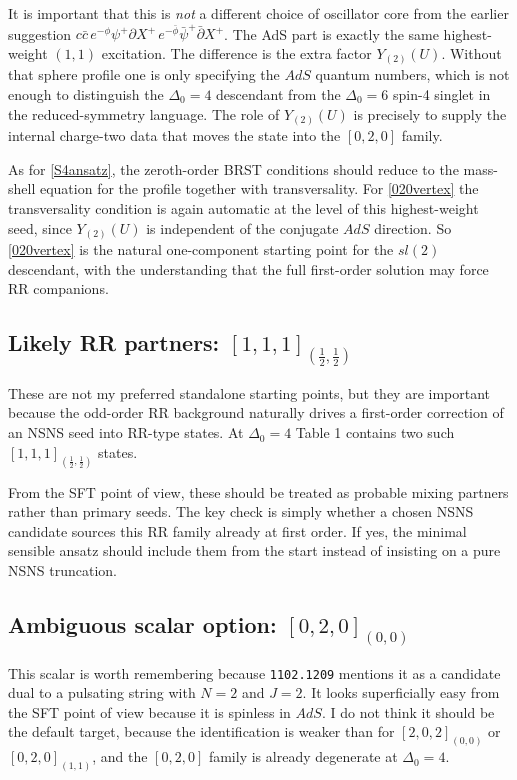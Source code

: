 \documentclass[12pt]{article}
\newcommand{\D}{\ensuremath{\Delta}}
\begin{document}
It is important that this is \emph{not} a different choice of oscillator core from the earlier
suggestion $c\bar c\,e^{-\phi}\psi^+\partial X^+\,e^{-\bar\phi}\bar\psi^+\bar\partial X^+$.
The AdS part is exactly the same highest-weight $(1,1)$ excitation. The difference is the extra factor
$Y_{(2)}(U)$.
Without that sphere profile one is only specifying the $AdS$ quantum numbers, which is not enough to
distinguish the $\D_0=4$ descendant from the $\D_0=6$ spin-4 singlet in the reduced-symmetry language.
The role of $Y_{(2)}(U)$ is precisely to supply the internal charge-two data that moves the state into the
$[0,2,0]$ family.

As for \eqref{S4ansatz}, the zeroth-order BRST conditions should reduce to the mass-shell equation for
the profile together with transversality. For \eqref{020vertex} the transversality condition is again
automatic at the level of this highest-weight seed, since $Y_{(2)}(U)$ is independent of the conjugate
$AdS$ direction. So \eqref{020vertex} is the natural one-component starting point for the $sl(2)$
descendant, with the understanding that the full first-order solution may force RR companions.

\subsection{Likely RR partners: \texorpdfstring{$[1,1,1]_{(\frac{1}{2},\frac{1}{2})}$}{[1,1,1](1/2,1/2)}}

These are not my preferred standalone starting points, but they are important because the odd-order RR
background naturally drives a first-order correction of an NSNS seed into RR-type states.
At $\D_0=4$ Table 1 contains two such $[1,1,1]_{(\frac{1}{2},\frac{1}{2})}$ states.

From the SFT point of view, these should be treated as probable mixing partners rather than primary seeds.
The key check is simply whether a chosen NSNS candidate sources this RR family already at first order.
If yes, the minimal sensible ansatz should include them from the start instead of insisting on a pure NSNS truncation.

\subsection{Ambiguous scalar option: \texorpdfstring{$[0,2,0]_{(0,0)}$}{[0,2,0](0,0)}}

This scalar is worth remembering because \texttt{1102.1209} mentions it as a candidate dual to a pulsating
string with $N=2$ and $J=2$. It looks superficially easy from the SFT point of view because it is spinless in $AdS$.
I do not think it should be the default target, because the identification is weaker than for
$[2,0,2]_{(0,0)}$ or $[0,2,0]_{(1,1)}$, and the $[0,2,0]$ family is already degenerate at $\D_0=4$.
\end{document}
